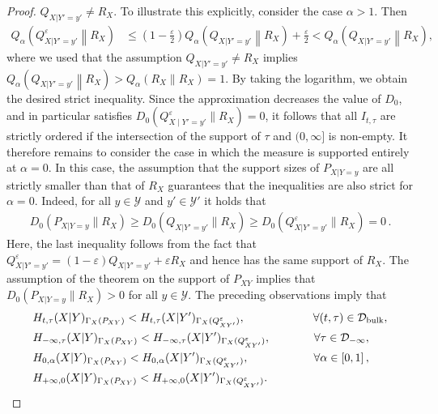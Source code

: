 \documentclass[aps,pra,11pt,onecolumn,nofootinbib,tightenlines]{revtex4-2}
\theoremstyle{definition}
\newcommand{\D}{\mathcal{D}}
\newcommand{\Y}{\mathcal{Y}}
\newcommand{\mc}[1]{\mathcal{#1}}
\begin{document}
\begin{proof}
$Q_{X|Y'=y'}\neq R_X$.
To illustrate this explicitly, consider the case $\alpha>1$. Then
\begin{align}
    Q_\alpha\!\left(Q^\varepsilon_{X|Y'=y'} \middle\| R_X \right)
    &\leq
    \left(1-\frac{\varepsilon}{2}\right)
    Q_\alpha\!\left(Q_{X|Y'=y'} \middle\| R_X \right)
    + \frac{\varepsilon}{2} <
    Q_\alpha\!\left(Q_{X|Y'=y'} \middle\| R_X \right) ,
\end{align}
where we used that the assumption $Q_{X|Y'=y'}\neq R_X$ implies $Q_\alpha\!\left(Q_{X|Y'=y'} \middle\| R_X \right)
>
Q_\alpha\!\left(R_X \middle\| R_X \right)
=1$.
By taking the logarithm, we obtain the desired strict inequality. Since the approximation decreases the value of $D_0$, and in particular satisfies $D_0(Q^{\varepsilon}_{X\mid Y'=y'} \| R_X)=0$, it follows that all $I_{t,\tau}$ are strictly ordered if the intersection of the support of $\tau$ and $(0,\infty]$ is non-empty. It therefore remains to consider the case in which the measure is supported entirely at $\alpha=0$.
In this case, the assumption that the support sizes of $P_{X|Y=y}$ are all strictly smaller than that of $R_X$ guarantees that the inequalities are also strict for $\alpha=0$. Indeed, for all $y\in\mc Y$ and $y'\in\mc Y'$ it holds that
 \begin{align}
     D_0 (P_{X|Y=y} \| R_X) \geq D_0 (Q_{X|Y'=y'} \| R_X) \geq D_0(Q^\varepsilon_{X|Y'=y'} \| R_X )  = 0 \,.
\end{align}
Here, the last inequality follows from the fact that $Q^\varepsilon_{X|Y'=y'} = (1-\varepsilon )Q_{X|Y'=y'} + \varepsilon R_X$ and hence has the same support of $R_X$. The assumption of the theorem on the support of $P_{XY}$ implies that $D_0(P_{X|Y=y}\|R_X)> 0$ for all $y\in \Y$.
 The preceding observations imply that
\begin{align}
    & H_{t,\tau}(X|Y)_{\Gamma_X(P_{XY})} < H_{t,\tau}(X|Y')_{\Gamma_X(Q^\varepsilon_{XY'})}, \qquad\qquad\qquad \forall (t,\tau) \in \D_{\rm{bulk}}, \\
    &H_{-\infty,\tau}(X|Y)_{\Gamma_X(P_{XY})} < H_{-\infty,\tau}(X|Y')_{\Gamma_X(Q^\varepsilon_{XY'})}, \quad\quad \quad  \;\;\; \forall \tau \in \D_{-\infty}, \\
    &H_{0,\alpha}(X|Y)_{\Gamma_X(P_{XY})} < H_{0,\alpha}(X|Y')_{\Gamma_X(Q^\varepsilon_{XY'})}, \quad\,\qquad \quad\quad\;\; \forall \alpha \in [0,1] \,,\\
    &H_{+\infty,0}(X|Y)_{\Gamma_X(P_{XY})} < H_{+\infty,0}(X|Y')_{\Gamma_X(Q^\varepsilon_{XY'})}.
\end{align}

\end{proof}
\end{document}

